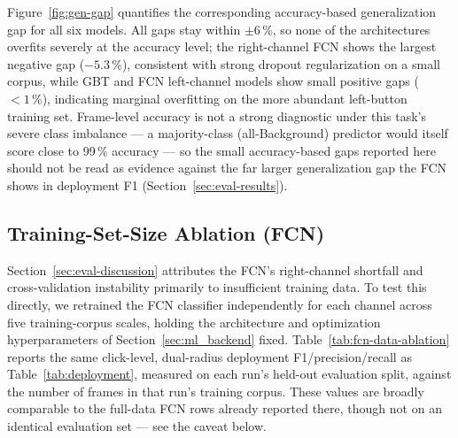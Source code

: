 

Figure~\ref{fig:gen-gap} quantifies the corresponding accuracy-based
generalization gap for all six models. All gaps stay within $\pm 6\,\%$,
so none of the architectures overfits severely at the accuracy level; the
right-channel FCN shows the largest negative gap ($-5.3\,\%$), consistent with
strong dropout regularization on a small corpus, while GBT and FCN left-channel
models show small positive gaps ($<1\,\%$), indicating marginal overfitting on
the more abundant left-button training set. Frame-level accuracy is not a
strong diagnostic under this task's severe class imbalance --- a majority-class
(all-Background) predictor would itself score close to 99\,\% accuracy --- so
the small accuracy-based gaps reported here should not be read as evidence
against the far larger generalization gap the FCN shows in deployment F1
(Section~\ref{sec:eval-results}).



\subsection{Training-Set-Size Ablation (FCN)}
\label{sec:eval-fcn-data-ablation}

Section~\ref{sec:eval-discussion} attributes the FCN's right-channel shortfall and
cross-validation instability primarily to insufficient training data. To test this
directly, we retrained the FCN classifier independently for each channel across five
training-corpus scales, holding the architecture and optimization hyperparameters of
Section~\ref{sec:ml_backend} fixed. Table~\ref{tab:fcn-data-ablation} reports the same
click-level, dual-radius deployment F1/precision/recall as Table~\ref{tab:deployment},
measured on each run's held-out evaluation split, against the number of frames in
that run's training corpus. These values are broadly comparable to the full-data
FCN rows already reported there, though not on an identical evaluation set --- see
the caveat below.

